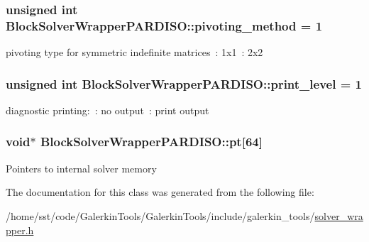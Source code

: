 \subsubsection[{\texorpdfstring{pivoting\+\_\+method}{pivoting_method}}]{\setlength{\rightskip}{0pt plus 5cm}unsigned int Block\+Solver\+Wrapper\+P\+A\+R\+D\+I\+S\+O\+::pivoting\+\_\+method = 1}\hypertarget{class_block_solver_wrapper_p_a_r_d_i_s_o_a2924ded1d130cdd30e865ff664d8dcf7}{}\label{class_block_solver_wrapper_p_a_r_d_i_s_o_a2924ded1d130cdd30e865ff664d8dcf7}
pivoting type for symmetric indefinite matrices~\+: 1x1~\+: 2x2 
\subsubsection[{\texorpdfstring{print\+\_\+level}{print_level}}]{\setlength{\rightskip}{0pt plus 5cm}unsigned int Block\+Solver\+Wrapper\+P\+A\+R\+D\+I\+S\+O\+::print\+\_\+level = 1}\hypertarget{class_block_solver_wrapper_p_a_r_d_i_s_o_aa87e38dcf8e35852fbb47b4792b2540d}{}\label{class_block_solver_wrapper_p_a_r_d_i_s_o_aa87e38dcf8e35852fbb47b4792b2540d}
diagnostic printing\+:~\+: no output~\+: print output 
\subsubsection[{\texorpdfstring{pt}{pt}}]{\setlength{\rightskip}{0pt plus 5cm}void$\ast$ Block\+Solver\+Wrapper\+P\+A\+R\+D\+I\+S\+O\+::pt\mbox{[}64\mbox{]}\hspace{0.3cm}{\ttfamily [private]}}\hypertarget{class_block_solver_wrapper_p_a_r_d_i_s_o_a4d1d5d9882ed7b4019b7412b0bbd125c}{}\label{class_block_solver_wrapper_p_a_r_d_i_s_o_a4d1d5d9882ed7b4019b7412b0bbd125c}
Pointers to internal solver memory 

The documentation for this class was generated from the following file\+:\begin{DoxyCompactItemize}
\item 
/home/sst/code/\+Galerkin\+Tools/\+Galerkin\+Tools/include/galerkin\+\_\+tools/\hyperlink{solver__wrapper_8h}{solver\+\_\+wrapper.\+h}\end{DoxyCompactItemize}
